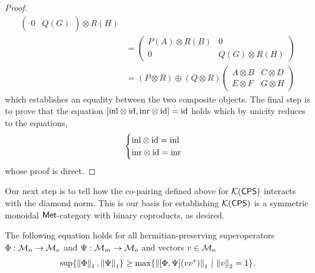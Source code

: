 \begin{proof}
\begin{equation*}
\begin{split}
\begin{pmatrix}
         0 & Q(G)
        \end{pmatrix} 
        \otimes R(H)
        \\
        & = 
        \begin{pmatrix}
         P(A) \otimes R(B) &  0
         \\
         0 & Q(G) \otimes R(H)
        \end{pmatrix} 
        \\
        &
        = 
        (P \otimes R) \oplus (Q \otimes R)
        \begin{pmatrix}
         A \otimes B & C \otimes D
         \\
         E \otimes F & G \otimes H
        \end{pmatrix} 
      \end{split}
        \end{equation*}
        which establishes an equality between the two composite objects.  The
        final step is to prove that the equation $[\mathrm{inl} \otimes \mathrm{id}, \mathrm{inr}
        \otimes \mathrm{id}] = \mathrm{id}$ holds which by unicity reduces to the equations,
        \[
                \begin{cases}
                        \mathrm{inl} \otimes \mathrm{id} = \mathrm{inl} \\
                        \mathrm{inr} \otimes \mathrm{id} = \mathrm{inr}
                \end{cases}
        \]
        whose proof is direct.
\end{proof}

Our next step is to tell how the co-pairing defined above for $\mathcal{K}{(\mathsf{CPS})}$
interacts with the diamond norm. This is our basis for
establishing $\mathcal{K}{(\mathsf{CPS})}$ is a symmetric monoidal $\mathsf{Met}$-category with binary coproducts, as desired.

\begin{proposition} \label{prop:op_ineq_cop_vv*}
The following equation holds for all hermitian-preserving superoperators $\Phi: \mathcal{M}_{n} \to \mathcal{M}_{o}$ and $\Psi:\mathcal{M}_{m} \to \mathcal{M}_{o}$ and vectors $v\in \mathcal{M}_{n}$
  \[\sup \{ \left\lVert \Phi \right\rVert_{1},\left\lVert \Psi \right\rVert_{1} \} \geq \max \{ \left\lVert [\Phi,\Psi] (vv^*) \right\rVert_{1} \, | \, \left\lVert v \right\rVert_{2}=1\}. \]
\end{proposition}

